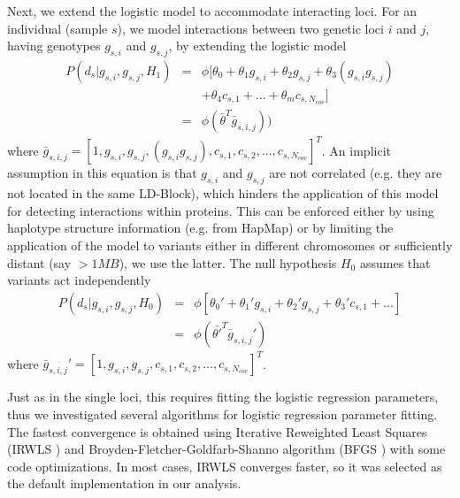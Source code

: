 Next, we extend the logistic model to accommodate interacting loci. For an individual (sample $s$), we model interactions between two genetic loci $i$ and $j$, having genotypes $g_{s,i}$ and $g_{s,j}$, by extending the logistic model
\begin{eqnarray} \label{eq:gwasLogRegH1}
    P( d_s | g_{s,i},g_{s,j}, H_1) & = & \phi[ \theta_0 + \theta_1 g_{s,i} + \theta_2 g_{s,j} + \theta_3 (g_{s,i} g_{s,j}) \\
    & & + \theta_4 c_{s,1} + ... + \theta_m c_{s,N_{cov}} ] \\
    & = & \phi( \bar{\theta}^T \bar{g}_{s,i,j}) )
\end{eqnarray}
\noindent where $\bar{g}_{s,i,j} =  [1, g_{s,i}, g_{s,j}, ( g_{s,i} g_{s,j}), c_{s,1}, c_{s,2}, ..., c_{s,N_{cov}} ]^T$. 
An implicit assumption in this equation is that $g_{s,i}$ and $g_{s,j}$ are not correlated (e.g. they are not located in the same LD-Block), which hinders the application of this model for detecting interactions within proteins.
This can be enforced either by using haplotype structure information (e.g. from HapMap) or by limiting the application of the model to variants either in different chromosomes or sufficiently distant (say $> 1MB$), we use the latter.
The null hypothesis $H_0$ assumes that variants act independently
\begin{eqnarray} \label{eq:gwasLogRegH0}
    P( d_s | g_{s,i},g_{s,j}, H_0) & = & \phi[ \theta_0' + \theta_1' g_{s,i} + \theta_2' g_{s,j} + \theta_3' c_{s,1} + ... ] \\
   & = & \phi( \bar{\theta'}^T \bar{g}_{s,i,j}' )
\end{eqnarray}
\noindent where $\bar{g}_{s,i,j}' =  [1, g_{s,i}, g_{s,j}, c_{s,1} , c_{s,2}, ..., c_{s,N_{cov}} ]^T$.

Just as in the single loci, this requires fitting the logistic regression parameters, thus we investigated several algorithms for logistic regression parameter fitting. 
The fastest convergence is obtained using Iterative Reweighted Least Squares (IRWLS \cite{daubechies2010iteratively}) and Broyden-Fletcher-Goldfarb-Shanno algorithm (BFGS \cite{broyden1970convergence}) with some code optimizations. In most cases, IRWLS converges faster, so it was selected as the default implementation in our analysis.

